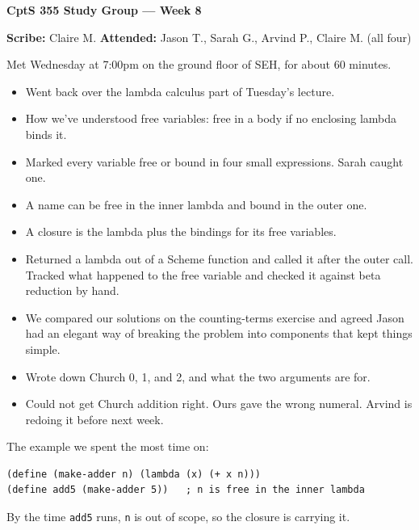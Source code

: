 \documentclass[11pt]{article}
\begin{document}
{\large\bfseries CptS 355 Study Group --- Week 8}

\smallskip
\textbf{Scribe:} Claire M. \qquad \textbf{Attended:} Jason T., Sarah G., Arvind P., Claire M. (all four)

\smallskip
Met Wednesday at 7:00pm on the ground floor of SEH, for about 60 minutes.

\begin{itemize}

\item Went back over the lambda calculus part of Tuesday's lecture.

\item How we've understood free variables: free in a body if no enclosing lambda binds it.

\item Marked every variable free or bound in four small expressions. Sarah caught one.

\item A name can be free in the inner lambda and bound in the outer one.

\item A closure is the lambda plus the bindings for its free variables.

\item Returned a lambda out of a Scheme function and called it after the outer call. Tracked what happened to the free variable and checked it against beta reduction by hand.

\item We compared our solutions on the counting-terms exercise and agreed Jason had an elegant way of breaking the problem into components that kept things simple.

\item Wrote down Church 0, 1, and 2, and what the two arguments are for.

\item Could not get Church addition right. Ours gave the wrong numeral. Arvind is redoing it before next week.

\end{itemize}

The example we spent the most time on:

\begin{lstlisting}
(define (make-adder n) (lambda (x) (+ x n)))
(define add5 (make-adder 5))   ; n is free in the inner lambda
\end{lstlisting}

By the time \texttt{add5} runs, \texttt{n} is out of scope, so the closure is carrying it.
\end{document}

